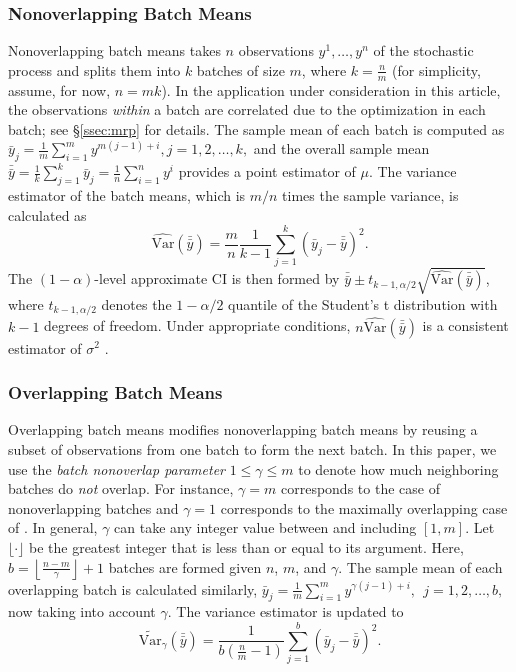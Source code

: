 \documentclass[12pt]{article}
\newcommand{\vartg}[1]{\widetilde{\mathrm{Var}}_\gamma \left( #1 \right)}
\newcommand{\varhat}{\widehat{\mathrm{Var}}}
\newcommand{\nb}{\left\lfloor\tfrac{n-m}{\gamma}\right\rfloor+1}
\newcommand{\yb}{\bar{y}}
\newcommand{\ybb}{\bar{\yb}}
\begin{document}
\subsubsection{Nonoverlapping Batch Means}

Nonoverlapping batch means takes $n$ observations $y^1, \dots, y^n$ of the stochastic process and splits them into $k$ batches of size $m$, where $k = \frac{n}{m}$ (for simplicity, assume, for now, $n = mk$).  
In the application under consideration in this article, the observations {\it within} a batch are correlated due to the optimization in each batch; see \S \ref{ssec:mrp} for details. 
The sample mean of each batch is computed as
$
	\yb_j = \frac{1}{m} \sum_{i=1}^{m} y^{m(j-1)+i}, j = 1,2, \dots, k,
$
and the overall sample mean $\ybb = \frac{1}{k} \sum_{j=1}^k \yb_j = \frac{1}{n} \sum_{i=1}^n y^i$ provides a point estimator of $\mu$.  
The variance estimator of the batch means, which is $m/n$ times the sample variance, is calculated as
\begin{equation} \label{eq:var}
	\varhat(\ybb) = \frac{m}{n}\frac{1}{k-1} \sum_{j=1}^k \left( \yb_j - \ybb \right)^2.
\end{equation}
The $(1-\alpha)$-level approximate CI is then formed by $\ybb \pm t_{k-1,\alpha/2} \sqrt{\varhat(\ybb)}$, where $t_{k-1,\alpha/2}$ denotes the $1-\alpha/2$ quantile of the Student's t distribution with $k-1$ degrees of freedom.  
Under appropriate conditions, $n\varhat(\ybb)$ is a consistent estimator of $\sigma^2$ \citep{alexo_enc_06}.

\subsubsection{Overlapping Batch Means}
\label{ssec:overlap}

Overlapping batch means modifies nonoverlapping batch means by reusing a subset of observations from one batch to form the next batch. 
In this paper, we use the {\it batch nonoverlap parameter} $1 \leq \gamma \leq m$ to denote how much neighboring batches do {\it not} overlap.  
For instance, $\gamma = m$ corresponds to the case of nonoverlapping batches and $\gamma = 1$ corresponds to the maximally overlapping case of \citet{Meketon1984}.  
In general, $\gamma$ can take any integer value between and including $[1,m]$. 
Let $\lfloor \cdot \rfloor$ be the greatest integer that is less than or equal to its argument. 
Here, $b=\nb$ batches are formed given $n$, $m$, and $\gamma$. 
The sample mean of each overlapping batch is calculated similarly, 
$
\yb_j = \frac{1}{m} \sum_{i=1}^m y^{\gamma(j-1) + i},\ \  j = 1, 2, \dots, b, 
$
now taking into account $\gamma$.   
The variance estimator is updated to
\begin{equation} \label{eq:variance_gamma}
	\vartg{\ybb} = \frac{1}{b \left( \tfrac{n}{m} - 1 \right) }  \sum_{j=1}^{b} (\yb_j - \ybb)^2.
\end{equation}
\end{document}
